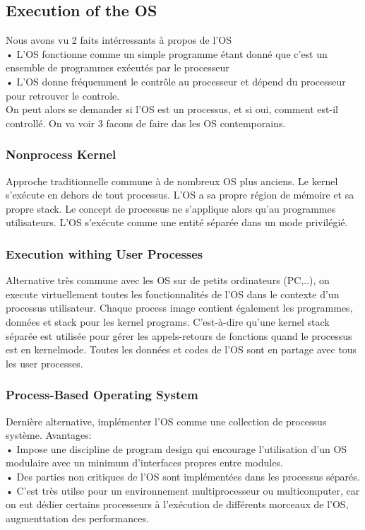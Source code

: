 \subsection{Execution of the OS}
Nous avons vu 2 faits intérressants à propos de l’OS \\
• L’OS fonctionne comme un simple programme étant donné que c’est un ensemble de programmes exécutés par le processeur \\
• L’OS donne fréquemment le contrôle au processeur et dépend du processeur pour retrouver le controle. \\
On peut alors se demander si l’OS est un processus, et si oui, comment est-il controllé. On va voir 3 facons de faire das les OS contemporains.
\subsubsection{Nonprocess Kernel}
Approche traditionnelle commune à de nombreux OS plus anciens. Le kernel s’exécute en dehors de tout processus. L’OS a sa propre région de mémoire et sa propre stack. Le concept de processus ne s’applique alors qu’au programmes utilisateurs. L’OS s’exécute comme une entité séparée dans un mode privilégié.
\subsubsection{Execution withing User Processes}
Alternative très commune avec les OS sur de petits ordinateurs (PC,..), on execute virtuellement toutes les fonctionnalités de l’OS dans le contexte d’un processus utilisateur. Chaque process image contient également les programmes, données et stack pour les kernel programs. C’est-à-dire qu’une kernel stack séparée est utilisée pour gérer les appels-retours de fonctions quand le processus est en kernelmode. Toutes les données et codes de l’OS sont en partage avec tous les user processes.
\subsubsection{Process-Based Operating System}
Dernière alternative, implémenter l’OS comme une collection de processus système. Avantages: \\
• Impose une discipline de program design qui encourage l’utilisation d’un OS modulaire avec un minimum d’interfaces propres entre modules. \\
• Des parties non critiques de l’OS sont implémentées dans les processus séparés. \\
• C’est très utilse pour un environnement multiprocesseur ou multicomputer, car on eut dédier certains processeurs à l’exécution de différents morceaux de l’OS, augmenttation des performances.
